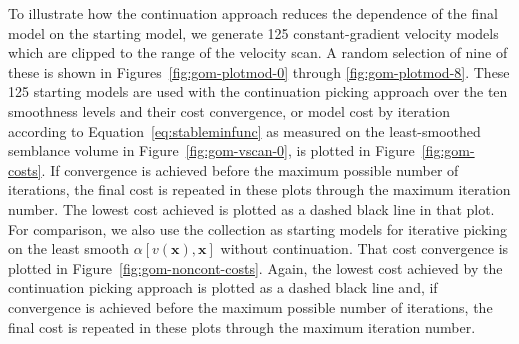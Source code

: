 

To illustrate how the continuation approach reduces the dependence of the final model on the starting model, we generate 125 constant-gradient velocity models which are clipped to the range of the velocity scan.  A random selection of nine of these is shown in Figures~\ref{fig:gom-plotmod-0} through \ref{fig:gom-plotmod-8}.  These 125 starting models are used with the continuation picking approach over the ten smoothness levels and their cost convergence, or model cost by iteration according to Equation~\ref{eq:stableminfunc} as measured on the least-smoothed semblance volume in Figure~\ref{fig:gom-vscan-0}, is plotted in Figure~\ref{fig:gom-costs}. If convergence is achieved before the maximum possible number of iterations, the final cost is repeated in these plots through the maximum iteration number. The lowest cost achieved is plotted as a dashed black line in that plot.  For comparison, we also use the collection as starting models for iterative picking on the least smooth $\alpha[v(\mathbf{x}),\mathbf{x}]$ without continuation.  That cost convergence is plotted in Figure~\ref{fig:gom-noncont-costs}.  Again, the lowest cost achieved by the continuation picking approach is plotted as a dashed black line and, if convergence is achieved before the maximum possible number of iterations, the final cost is repeated in these plots through the maximum iteration number. 



